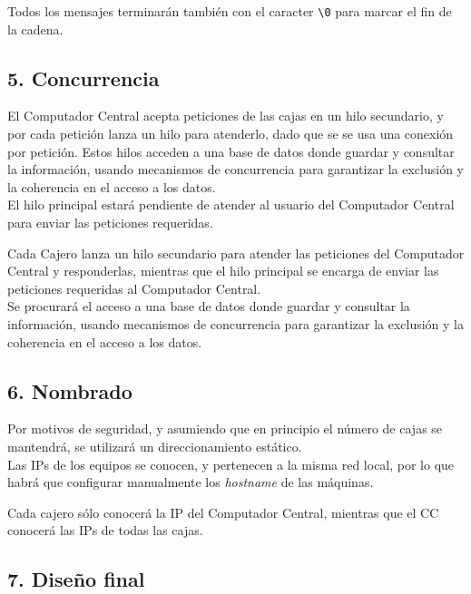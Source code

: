 Todos los mensajes terminarán también con el caracter \texttt{\textbackslash{}0} para marcar el fin de la cadena.

\subsection*{5. Concurrencia}

El Computador Central acepta peticiones de las cajas en un hilo secundario, y por cada petición lanza un hilo para atenderlo, dado que se se usa una conexión por petición. Estos hilos acceden a una base de datos donde guardar y consultar la información, usando mecanismos de concurrencia para garantizar la exclusión y la coherencia en el acceso a los datos.\\
El hilo principal estará pendiente de atender al usuario del Computador Central para enviar las peticiones requeridas.\newline

Cada Cajero lanza un hilo secundario para atender las peticiones del Computador Central y responderlas, mientras que el hilo principal se encarga de enviar las peticiones requeridas al Computador Central.\\
Se procurará el acceso a una base de datos donde guardar y consultar la información, usando mecanismos de concurrencia para garantizar la exclusión y la coherencia en el acceso a los datos.


\subsection*{6. Nombrado}

Por motivos de seguridad, y asumiendo que en principio el número de cajas se mantendrá, se utilizará un direccionamiento estático.\\
Las IPs de los equipos se conocen, y pertenecen a la misma red local, por lo que habrá que configurar manualmente los \textit{hostname} de las máquinas.\newline

Cada cajero sólo conocerá la IP del Computador Central, mientras que el CC conocerá las IPs de todas las cajas.


\subsection*{7. Diseño final}

